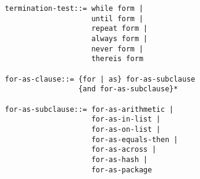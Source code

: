 \begin{verbatim}
termination-test::= while form | 
                    until form | 
                    repeat form | 
                    always form | 
                    never form | 
                    thereis form 

for-as-clause::= {for | as} for-as-subclause 
                 {and for-as-subclause}* 

for-as-subclause::= for-as-arithmetic | 
                    for-as-in-list | 
                    for-as-on-list | 
                    for-as-equals-then | 
                    for-as-across | 
                    for-as-hash | 
                    for-as-package 
\end{verbatim}
